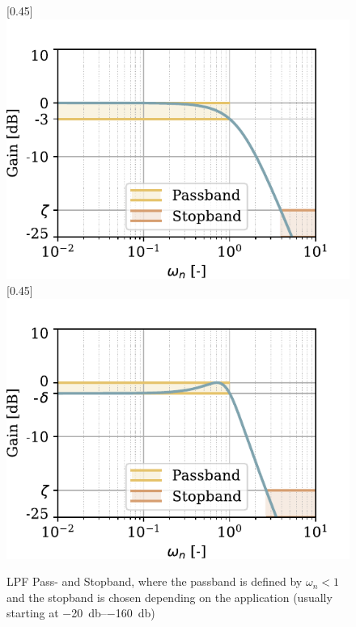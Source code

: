\begin{figure}[!htb]
  \centering
  [0.45\textwidth]{%
    \includegraphics[scale=0.72]{figures/electronics/lowpass/lp_filter_2ord_bessel_bp}}
  \hfill
  [0.45\textwidth]{%
    \includegraphics[scale=0.72]{figures/electronics/lowpass/lp_filter_2ord_cheby_bp}}
  \caption[\ac{LPF} Pass- and Stopband]{\ac{LPF} Pass- and Stopband, where the passband is defined by $\omega_n<1$ and the stopband is chosen depending on the application (usually starting at \SIrange{-20}{-160}{\decibel})%
    \label{fig:lp_lowpass_pass_stopband}}
\end{figure}

